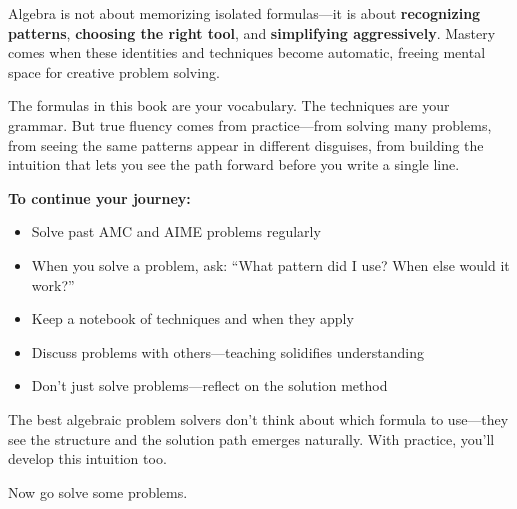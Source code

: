 \documentclass[12pt]{extarticle}
\begin{document}
Algebra is not about memorizing isolated formulas—it is about \textbf{recognizing patterns}, \textbf{choosing the right tool}, and \textbf{simplifying aggressively}. Mastery comes when these identities and techniques become automatic, freeing mental space for creative problem solving.

The formulas in this book are your vocabulary. The techniques are your grammar. But true fluency comes from practice—from solving many problems, from seeing the same patterns appear in different disguises, from building the intuition that lets you see the path forward before you write a single line.

\textbf{To continue your journey:}
\begin{itemize}
    \item Solve past AMC and AIME problems regularly
    \item When you solve a problem, ask: ``What pattern did I use? When else would it work?''
    \item Keep a notebook of techniques and when they apply
    \item Discuss problems with others—teaching solidifies understanding
    \item Don't just solve problems—reflect on the solution method
\end{itemize}

The best algebraic problem solvers don't think about which formula to use—they see the structure and the solution path emerges naturally. With practice, you'll develop this intuition too.

Now go solve some problems.
\end{document}
